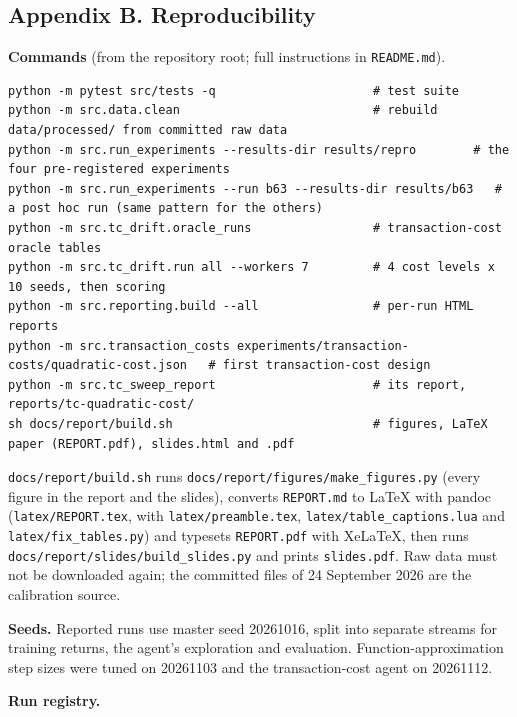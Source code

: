 \documentclass[
  11pt]{article}
\begin{document}
\subsection{Appendix B.
Reproducibility}\label{appendix-b.-reproducibility}

\textbf{Commands} (from the repository root; full instructions in
\texttt{README.md}).

\begin{verbatim}
python -m pytest src/tests -q                      # test suite
python -m src.data.clean                           # rebuild data/processed/ from committed raw data
python -m src.run_experiments --results-dir results/repro        # the four pre-registered experiments
python -m src.run_experiments --run b63 --results-dir results/b63   # a post hoc run (same pattern for the others)
python -m src.tc_drift.oracle_runs                 # transaction-cost oracle tables
python -m src.tc_drift.run all --workers 7         # 4 cost levels x 10 seeds, then scoring
python -m src.reporting.build --all                # per-run HTML reports
python -m src.transaction_costs experiments/transaction-costs/quadratic-cost.json   # first transaction-cost design
python -m src.tc_sweep_report                      # its report, reports/tc-quadratic-cost/
sh docs/report/build.sh                            # figures, LaTeX paper (REPORT.pdf), slides.html and .pdf
\end{verbatim}

\texttt{docs/report/build.sh} runs
\texttt{docs/report/figures/make\_figures.py} (every figure in the
report and the slides), converts \texttt{REPORT.md} to LaTeX with pandoc
(\texttt{latex/REPORT.tex}, with \texttt{latex/preamble.tex},
\texttt{latex/table\_captions.lua} and \texttt{latex/fix\_tables.py})
and typesets \texttt{REPORT.pdf} with XeLaTeX, then runs
\texttt{docs/report/slides/build\_slides.py} and prints
\texttt{slides.pdf}. Raw data must not be downloaded again; the
committed files of 24 September 2026 are the calibration source.

\textbf{Seeds.} Reported runs use master seed 20261016, split into
separate streams for training returns, the agent's exploration and
evaluation. Function-approximation step sizes were tuned on 20261103 and
the transaction-cost agent on 20261112.

\textbf{Run registry.}
\end{document}
